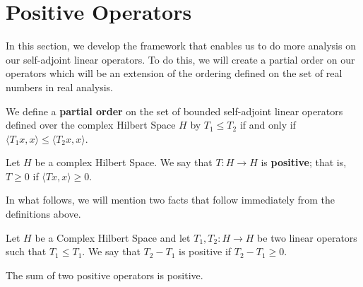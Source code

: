 \section{Positive Operators}

In this section, we develop the framework that enables us to do more analysis on our self-adjoint linear operators. To do this, we will create a partial order on our operators which will be an extension of the ordering defined on the set of real numbers in real analysis.

\begin{definition}
    We define a \textbf{partial order} on the set of bounded self-adjoint linear operators defined over the complex Hilbert Space \( H  \) by \( {T}_{1} \leq {T}_{2}  \) if and only if \( \langle {T}_{1}x  , x   \rangle \leq \langle {T}_{2} x  ,  x  \rangle  \).
\end{definition}

\begin{definition}
    Let \( H  \) be a complex Hilbert Space. We say that \( T: H \to  H \) is \textbf{positive}; that is, \( T \geq  0  \) if \( \langle Tx  ,  x  \rangle \geq 0  \).
\end{definition}

In what follows, we will mention two facts that follow immediately from the definitions above. 

\begin{lemma}
    Let \( H  \) be a Complex Hilbert Space and let \( {T}_{1}, {T}_{2} : H \to H  \) be two linear operators such that \( {T}_{1} \leq {T}_{1} \). We say that \( {T}_{2} - {T}_{1}  \) is positive if \( {T}_{2} - {T}_{1} \geq 0  \). 
\end{lemma}

\begin{lemma}
    The sum of two positive operators is positive.
\end{lemma}


